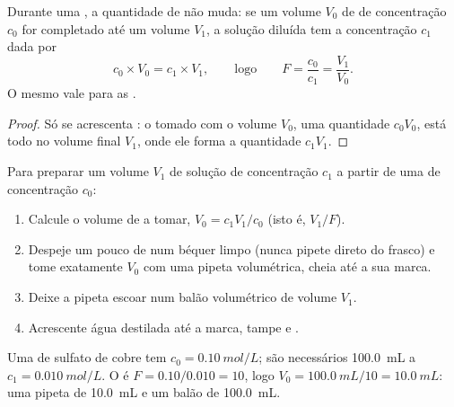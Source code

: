 \begin{proposition}\label{prop:g10:concentration-and-dilution:kept}
Durante uma , a quantidade de  não muda: se um volume
$V_0$ de  de concentração $c_0$ for completado até um
volume $V_1$, a solução diluída tem a concentração $c_1$ dada por
\[
  c_0 \times V_0 = c_1 \times V_1,
  \qquad\text{logo}\qquad
  F = \frac{c_0}{c_1} = \frac{V_1}{V_0} .
\]
O mesmo vale para as .
\end{proposition}

\begin{proof}
Só se acrescenta : o  tomado com o volume $V_0$, uma
quantidade $c_0 V_0$, está todo no volume final $V_1$, onde ele forma a
quantidade $c_1 V_1$.
\end{proof}


\begin{method}\label{met:g10:concentration-and-dilution:diluting}
Para preparar um volume $V_1$ de solução de concentração $c_1$ a partir
de uma  de concentração $c_0$:
\begin{enumerate}
  \item Calcule o volume de  a tomar,
        $V_0 = c_1 V_1 / c_0$ (isto é, $V_1 / F$).
  \item Despeje um pouco de  num béquer limpo (nunca
        pipete direto do frasco) e tome exatamente $V_0$ com uma pipeta
        volumétrica, cheia até a sua marca.
  \item Deixe a pipeta escoar num balão volumétrico de volume $V_1$.
  \item Acrescente água destilada até a marca, tampe e .
\end{enumerate}
\end{method}

\begin{example}\label{ex:g10:concentration-and-dilution:tenfold}
Uma  de sulfato de cobre tem $c_0 = \qty{0.10}{mol/L}$;
são necessários \qty{100.0}{mL} a $c_1 = \qty{0.010}{mol/L}$. O  é $F = 0.10 / 0.010 = 10$, logo $V_0 = \qty{100.0}{mL} / 10 =
\qty{10.0}{mL}$: uma pipeta de \qty{10.0}{mL} e um balão de
\qty{100.0}{mL}.
\end{example}

